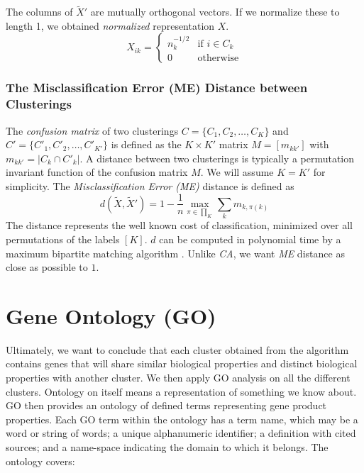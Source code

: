 The columns of $\tilde{X}'$ are mutually orthogonal vectors. If we normalize these to length 1, we obtained \textit{normalized} representation $X$.
\begin{equation*}
X_{ik} = \begin{cases}
n_k^{-1/2} & \text{if $i \in C_k$} \\
0 & \text{otherwise}
\end{cases}
\end{equation*}

\subsubsection{The Misclassification Error (ME) Distance between Clusterings}
The \textit{confusion matrix} of two clusterings $C = \{C_1,C_2, \dots, C_K\}$ and $C' = \{C'_1, C'_2, \dots, C'_{K'}\}$ is defined as the $K \times K'$ matrix $M = [m_{kk'}]$ with $m_{kk'}= |C_k \cap C'_k|$. A distance between two clusterings is typically a permutation invariant function of the confusion matrix $M$. We will assume $K= K'$ for simplicity. The \textit{Misclassification Error (ME)} distance is defined as 
\begin{equation*}
d(\tilde{X}, \tilde{X}') = 1 - \frac{1}{n}\operatorname{max}_{\pi \in \prod_K}\sum_k m_{k,\pi(k)}
\end{equation*}
The distance represents the well known cost of classification, minimized over all permutations of the labels $[K]$. $d$ can be computed in polynomial time by a maximum bipartite matching algorithm \cite{Papadimitriou}. Unlike \textit{CA}, we want \textit{ME} distance as close as possible to $1$.
\section{Gene Ontology (GO)} \label{2.4}
Ultimately, we want to conclude that each cluster obtained from the algorithm contains genes that will share similar biological properties and distinct biological properties with another cluster. We then apply GO analysis on all the different clusters. Ontology on itself means a representation of something we know about. GO then provides an ontology of defined terms representing gene product properties. Each GO term within the ontology has a term name, which may be a word or string of words; a unique alphanumeric identifier; a definition with cited sources; and a name-space indicating the domain to which it belongs. The ontology covers:

